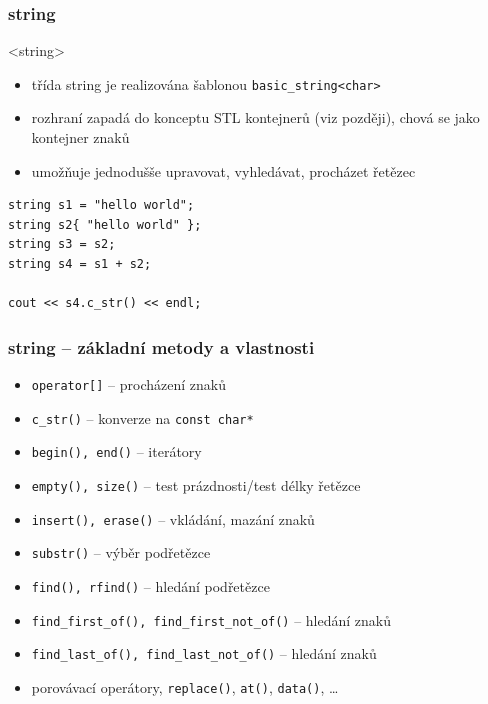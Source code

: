 
\begin{frame}[fragile]
\frametitle{string}

\begin{block}{<string>}
\begin{itemize}
\item třída string je realizována šablonou \lstinline|basic_string<char>|
\item rozhraní zapadá do konceptu STL kontejnerů (viz později), chová se jako kontejner znaků
\item umožňuje jednodušše upravovat, vyhledávat, procházet řetězec
\end{itemize}
\end{block}

\begin{yesblock}
\begin{lstlisting}
string s1 = "hello world";
string s2{ "hello world" };
string s3 = s2;
string s4 = s1 + s2;

cout << s4.c_str() << endl;
\end{lstlisting}
\end{yesblock}
\end{frame}


\begin{frame}[fragile]
\frametitle{string -- základní metody a vlastnosti}

\begin{block}{}
\begin{itemize}
\item \lstinline|operator[]| -- procházení znaků
\item \lstinline|c_str()| -- konverze na \lstinline|const char*|
\item \lstinline|begin(), end()| -- iterátory
\item \lstinline|empty(), size()| -- test prázdnosti/test délky řetězce
\item \lstinline|insert(), erase()| -- vkládání, mazání znaků
\item \lstinline|substr()| -- výběr podřetězce
\item \lstinline|find(), rfind()| -- hledání podřetězce
\item \lstinline|find_first_of(), find_first_not_of()| -- hledání znaků
\item \lstinline|find_last_of(), find_last_not_of()| -- hledání znaků
\item porovávací operátory, \lstinline|replace()|, \lstinline|at()|, \lstinline|data()|, \ldots
\end{itemize}
\end{block}
\end{frame}



